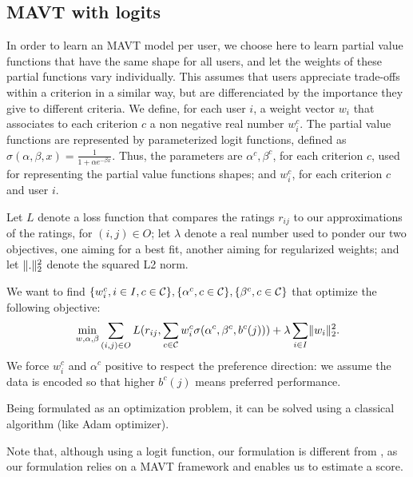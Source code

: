 \documentclass[version=3.21, pagesize, twoside=off, bibliography=totoc, DIV=calc, fontsize=12pt, a4paper, french, english]{scrartcl}
\begin{document}
\subsection{MAVT with logits}
In order to learn an MAVT model per user, we choose here to learn partial value functions that have the same shape for all users, and let the weights of these partial functions vary individually. 
This assumes that users appreciate trade-offs within a criterion in a similar way, but are differenciated by the importance they give to different criteria.
We define, for each user $i$, a weight vector $w_i$ that associates to each criterion $c$ a non negative real number $w_i^c$. 
The partial value functions are represented by parameterized logit functions, defined as $\sigma(\alpha, \beta, x) = \frac{1}{1+\alpha e^{-\beta x}}$. Thus, the parameters are $\alpha^c, \beta^c$, for each criterion $c$, used for representing the partial value functions shapes; and $w^c_i$, for each criterion $c$ and user $i$.

Let $L$ denote a loss function that compares the ratings $r_{ij}$ to our approximations of the ratings, for $(i, j) \in O$; let $\lambda$ denote a real number used to ponder our two objectives, one aiming for a best fit, another aiming for regularized weights; and let $\lVert.\rVert_2^2$ denote the squared L2 norm.

We want to find $\{w_i^c, i \in I, c \in \mathcal{C}\}, \{\alpha^c, c \in \mathcal{C}\}, \{\beta^c, c \in \mathcal{C}\}$ that optimize the following objective:
\begin{equation}
\min_{w, \alpha, \beta} \sum_{(i, j) \in O} L(r_{ij}, \sum_{c \in \mathcal{C}} w_i^c \sigma(\alpha^c, \beta^c, b^c(j))) + \lambda \sum_{i \in I} \lVert w_i\rVert_2^2.
\end{equation}
We force $w^c_i$ and $\alpha^c$ positive to respect the preference direction: we assume the data is encoded so that higher $b^c(j)$ means preferred performance.

Being formulated as an optimization problem, it can be solved using a classical algorithm (like Adam optimizer).

Note that, although using a logit function, our formulation is different from \citet{johnson_logistic_2014}, as our formulation relies on a MAVT framework and enables us to estimate a score.
\end{document}
